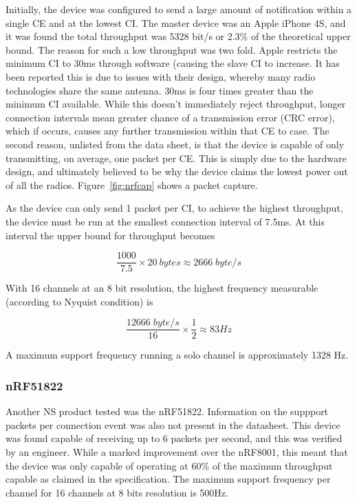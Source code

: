 \documentclass[]{article}
\begin{document}
Initially, the device was configured to send a large amount of notification within a single \ac{CE} and at the lowest \ac{CI}. The master device was an Apple iPhone 4S, and it was found the total throughput was 5328 bit/s or 2.3\% of the theoretical upper bound. The reason for such a low throughput was two fold. Apple restricts the minimum \ac{CI} to 30ms through software (causing the slave \ac{CI} to increase. It has been reported this is due to issues with their design, whereby many radio technologies share the same antenna. 30ms is four times greater than the minimum \ac{CI} available. While this doesn't immediately reject throughput, longer connection intervals mean greater chance of a transmission error (CRC error), which if occurs, causes any further transmission within that \ac{CE} to case. The second reason, unlisted from the data sheet\cite{nrf8001}, is that the device is capable of only transmitting, on average, one packet per \ac{CE}. This is simply due to the hardware design, and ultimately believed to be why the device claims the lowest power out of all the radios. Figure~\ref{fig:nrfcap} shows a packet capture.


As the device can only send 1 packet per \ac{CI}, to achieve the highest throughput, the device must be run at the smallest connection interval of 7.5ms. At this interval the upper bound for throughput becomes

\begin{displaymath}
\frac{1000}{7.5} \times 20\:bytes \approx 2666\;byte/s
\end{displaymath}

With 16 channels at an 8 bit resolution, the highest frequency measurable (according to Nyquist condition) is 

\begin{displaymath}
\frac{1 2666\; byte/s}{16} \times \frac{1}{2} \approx 83  Hz
\end{displaymath}

A maximum support frequency running a solo channel is approximately 1328 Hz.

\subsubsection{nRF51822}
Another \ac{NS} product tested was the nRF51822. Information on the suppport packets per connection event was also not present in the datasheet\cite{nrf51822}. This device was found capable of receiving up to 6 packets per second, and this was verified by an engineer\cite{olme}. While a marked improvement over the nRF8001, this meant that the device was only capable of operating at 60\% of the maximum throughput capable as claimed in the specification. The maximum support frequency per channel for 16 channels at 8 bits resolution is 500Hz.
\end{document}

